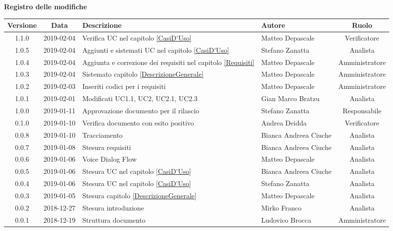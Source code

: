 	\begin{center}
		\textbf{Registro delle modifiche}
	\end{center}
	\begin{center}
		\begin{tabularx}{\textwidth}{|c|c|X|X|c|}
			\hline
			\textbf{Versione} & \textbf{Data} & \textbf{Descrizione} & \textbf{Autore} & \textbf{Ruolo} \\
			\hline
			1.1.0 & 2019-02-04 & Verifica UC nel capitolo \ref{CasiD'Uso}& Matteo Depascale & Verificatore\\
			\hline
			1.0.5 & 2019-02-04 & Aggiunti e sistemati UC nel capitolo \ref{CasiD'Uso}& Stefano Zanatta & Analista\\
			\hline
			1.0.4 & 2019-02-04 & Aggiunta e correzione dei requisiti nel capitolo \ref{Requisiti}& Matteo Depascale & Amministratore\\
			\hline
			1.0.3 & 2019-02-04 & Sistemato capitolo \ref{DescrizioneGenerale}& Matteo Depascale & Amministratore\\
			\hline
			1.0.2 & 2019-02-03 & Inseriti codici per i requisiti & Matteo Depascale & Amministratore\\
			\hline
			1.0.1 & 2019-02-01 & Modificati UC1.1, UC2, UC2.1, UC2.3 & Gian Marco Bratzu & Analista\\
			\hline
			1.0.0 & 2019-01-11 & Approvazione documento per il rilascio& Stefano Zanatta & Responsabile\\
			\hline
			0.1.0 & 2019-01-10 & Verifica documento con esito positivo& Andrea Deidda & Verificatore\\
			\hline
			0.0.8 & 2019-01-10 & Tracciamento& Bianca Andreea Ciuche& Analista\\
			\hline
			0.0.7 & 2019-01-08 & Stesura requisiti & Bianca Andreea Ciuche& Analista\\
			\hline
			0.0.6 & 2019-01-06 & Voice Dialog Flow & Matteo Depascale & Analista\\
			\hline
			0.0.5 & 2019-01-06 & Stesura UC nel capitolo \ref{CasiD'Uso}& Bianca Andreea Ciuche & Analista\\
			\hline
			0.0.4 & 2019-01-06 & Stesura UC nel capitolo \ref{CasiD'Uso}& Stefano Zanatta & Analista\\
			\hline
			0.0.3 & 2019-01-05 & Stesura capitolo \ref{DescrizioneGenerale}& Matteo Depascale & Analista\\
			\hline
			0.0.2 & 2018-12-27 & Stesura introduzione & Mirko Franco & Analista\\
			\hline
			0.0.1 & 2018-12-19 & Struttura documento & Ludovico Brocca & Amministratore\\
			\hline
		\end{tabularx}
	\end{center}
\newpage